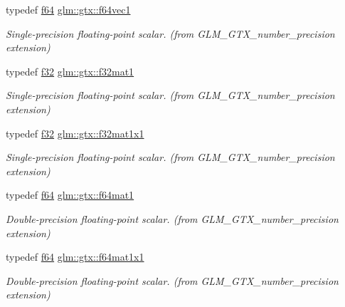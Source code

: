 \begin{DoxyCompactItemize}
typedef \hyperlink{group__gtc__type__precision_ga2bba392e555124b36cde6abba349bab3}{f64} \hyperlink{group__gtx__number__precision_ga44336a26c958d66efdfb5a6c114c538e}{glm\+::gtx\+::f64vec1}
\begin{DoxyCompactList}\small\item\em Single-\/precision floating-\/point scalar. (from G\+L\+M\+\_\+\+G\+T\+X\+\_\+number\+\_\+precision extension) \end{DoxyCompactList}\item 
typedef \hyperlink{group__gtc__type__precision_ga0ec999b57f5330d9021256e96038df04}{f32} \hyperlink{group__gtx__number__precision_gae5ff376ec910c360f06acc0c2b99260c}{glm\+::gtx\+::f32mat1}
\begin{DoxyCompactList}\small\item\em Single-\/precision floating-\/point scalar. (from G\+L\+M\+\_\+\+G\+T\+X\+\_\+number\+\_\+precision extension) \end{DoxyCompactList}\item 
typedef \hyperlink{group__gtc__type__precision_ga0ec999b57f5330d9021256e96038df04}{f32} \hyperlink{group__gtx__number__precision_ga01caec78388a82a9a22bd45e5751a38a}{glm\+::gtx\+::f32mat1x1}
\begin{DoxyCompactList}\small\item\em Single-\/precision floating-\/point scalar. (from G\+L\+M\+\_\+\+G\+T\+X\+\_\+number\+\_\+precision extension) \end{DoxyCompactList}\item 
typedef \hyperlink{group__gtc__type__precision_ga2bba392e555124b36cde6abba349bab3}{f64} \hyperlink{group__gtx__number__precision_ga23f8f53c78b50aa07a113c3d07d01bc9}{glm\+::gtx\+::f64mat1}
\begin{DoxyCompactList}\small\item\em Double-\/precision floating-\/point scalar. (from G\+L\+M\+\_\+\+G\+T\+X\+\_\+number\+\_\+precision extension) \end{DoxyCompactList}\item 
typedef \hyperlink{group__gtc__type__precision_ga2bba392e555124b36cde6abba349bab3}{f64} \hyperlink{group__gtx__number__precision_ga710a5952d78b22635c71c5fc2c0a3319}{glm\+::gtx\+::f64mat1x1}
\begin{DoxyCompactList}\small\item\em Double-\/precision floating-\/point scalar. (from G\+L\+M\+\_\+\+G\+T\+X\+\_\+number\+\_\+precision extension) \end{DoxyCompactList}\end{DoxyCompactItemize}


